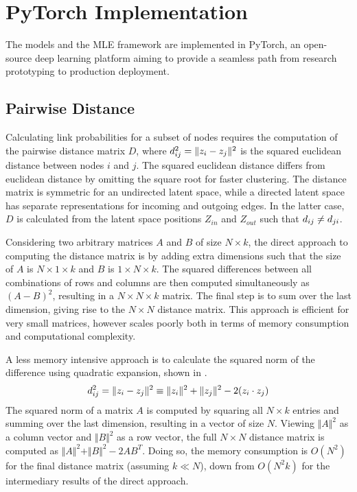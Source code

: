 \section{PyTorch Implementation}

The models and the MLE framework are implemented in PyTorch, an open-source deep learning platform aiming to provide a seamless path from research prototyping to production deployment.

\subsection{Pairwise Distance}

    Calculating link probabilities for a subset of nodes requires the computation of the pairwise distance matrix $D$, where $\sub(d)^2=\Vert z_i-z_j\Vert^2$ is the squared euclidean distance between nodes $i$ and $j$. The squared euclidean distance differs from euclidean distance by omitting the square root for faster clustering. The distance matrix is symmetric for an undirected latent space, while a directed latent space has separate representations for incoming and outgoing edges. In the latter case, $D$ is calculated from the latent space positions $Z_{in}$ and $Z_{out}$ such that $\sub(d)\neq\sub(d)(ji)$.
    
    Considering two arbitrary matrices $A$ and $B$ of size $N\times k$, the direct approach to computing the distance matrix is by adding extra dimensions such that the size of $A$ is $N\times 1\times k$ and $B$ is $1\times N\times k$. The squared differences between all combinations of rows and columns are then computed simultaneously as $(A-B)^2$, resulting in a $N\times N\times k$ matrix. The final step is to sum over the last dimension, giving rise to the $N\times N$ distance matrix. This approach is efficient for very small matrices, however scales poorly both in terms of memory consumption and computational complexity.
    
    A less memory intensive approach is to calculate the squared norm of the difference using quadratic expansion, shown in .
    \begin{equation}\label{eq:pyimpl-dist-quadratic}
        \sub(d)^2=\Vert z_i-z_j\Vert^2\equiv\Vert z_i\Vert^2 + \Vert z_j\Vert^2 - 2(z_i\cdot z_j)
    \end{equation}
    The squared norm of a matrix $A$ is computed by squaring all $N\times k$ entries and summing over the last dimension, resulting in a vector of size $N$. Viewing $\Vert A\Vert^2$ as a column vector and $\Vert B\Vert^2$ as a row vector, the full $N\times N$ distance matrix is computed as $\Vert A\Vert^2 + \Vert B\Vert^2 - 2AB^T$. Doing so, the memory consumption is $O(N^2)$ for the final distance matrix (assuming $k\ll N$), down from $O(N^2k)$ for the intermediary results of the direct approach.
    
